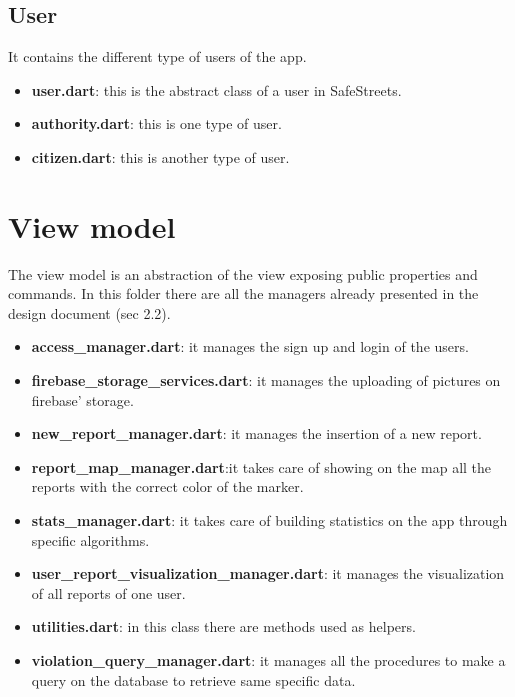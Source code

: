 \documentclass[../ITD.tex]{subfiles}
\begin{document}
    \subsection{User}\label{subsec:user}
    It contains the different type of users of the app.
    \begin{itemize}
        \item \textbf{user.dart}: this is the abstract class of a user in SafeStreets.
        \item \textbf{authority.dart}: this is one type of user.
        \item \textbf{citizen.dart}: this is another type of user.
    \end{itemize}
    \section{View model}\label{sec:view-model}
    The view model is an abstraction of the view exposing public properties and commands.
    In this folder there are all the managers already presented in the design document (sec 2.2).
    \begin{itemize}
        \item \textbf{access\_manager.dart}: it manages the sign up and login of the users.
        \item \textbf{firebase\_storage\_services.dart}: it manages the uploading of pictures on firebase' storage.
        \item \textbf{new\_report\_manager.dart}: it manages the insertion of a new report.
        \item \textbf{report\_map\_manager.dart}:it takes care of showing on the map all the reports with the correct color of the marker.
        \item \textbf{stats\_manager.dart}: it takes care of building statistics on the app through specific algorithms.
        \item \textbf{user\_report\_visualization\_manager.dart}: it manages the visualization of all reports of one user.
        \item \textbf{utilities.dart}: in this class there are methods used as helpers.
        \item \textbf{violation\_query\_manager.dart}: it manages all the procedures to make a query on the database to retrieve same specific data.
    \end{itemize}
\end{document}
